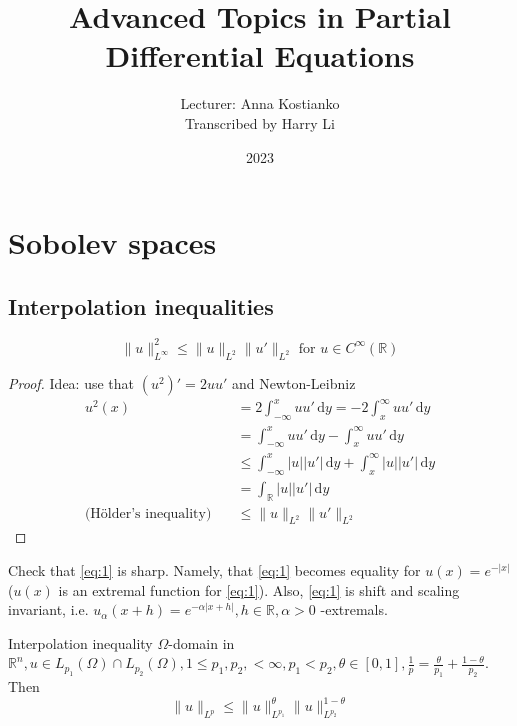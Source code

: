 \documentclass{report}
\title{\Huge{Advanced Topics in Partial Differential Equations}}
\author{Lecturer: Anna Kostianko \\ Transcribed by Harry Li}
\date{2023}
\begin{document}

\newpage

\tableofcontents

\setcounter{chapter}{1}

\chapter{Sobolev spaces}
\section{Interpolation inequalities}

\begin{example}{}{}
    \begin{equation} \label{eq:1}
        \|u\|_{L^{\infty}}^{2} \leq \|u\|_{L^{2}} \|u'\|_{L^{2}} \text{ for } u \in C^{\infty}(\mathbb{R}) 
    \end{equation}
\end{example}

\begin{proof}
    Idea: use that \((u^2)' = 2uu'\) and Newton-Leibniz
    \begin{align*}
        u^2(x) &= 2 \int_{-\infty}^{x} u u' \,\mathrm{d}y = -2 \int_{x}^{\infty} u u' \,\mathrm{d}y \\
        &= \int_{-\infty}^{x} u u' \,\mathrm{d}y - \int_{x}^{\infty} u u' \,\mathrm{d}y \\
        & \leq \int_{-\infty}^{x} \vert u \vert \vert u' \vert \,\mathrm{d}y + \int_{x}^{\infty} \vert u \vert \vert u' \vert \,\mathrm{d}y \\
        &= \int_{\mathbb{R}} \vert u \vert \vert u' \vert \,\mathrm{d}y \\
        \text{(Hölder's inequality)} \quad & \leq \|u\|_{L^{2}} \|u'\|_{L^{2}}
    \end{align*}
\end{proof}

\qs{}
{
    Check that \ref{eq:1} is sharp. Namely, that \ref{eq:1} becomes equality for \(u(x) = e^{-\vert x \vert}\) (\(u(x)\) is an extremal function for \ref{eq:1}). Also, \ref{eq:1} is shift and scaling invariant, i.e. \(u_{\alpha}(x+h) = e^{-\alpha|x+h|}, h \in \mathbb{R}, \alpha>0\) -extremals.
}

\begin{example}{Interpolation inequality}{}
    \(\Omega\)-domain in \(\mathbb{R}^{n}, u \in L_{p_1}(\Omega) \cap L_{p_2}(\Omega), 1 \leq p_1, p_2, < \infty, p_1 < p_2, \theta \in [0, 1], \frac{1}{p} = \frac{\theta}{p_1} + \frac{1-\theta}{p_2}\). Then
    \begin{equation}\label{eq:2}
        \|u\|_{L^{p}} \leq \|u\|_{L^{p_1}}^{\theta} \|u\|_{L^{p_2}}^{1 - \theta}
    \end{equation} 
\end{example}
\end{document}
